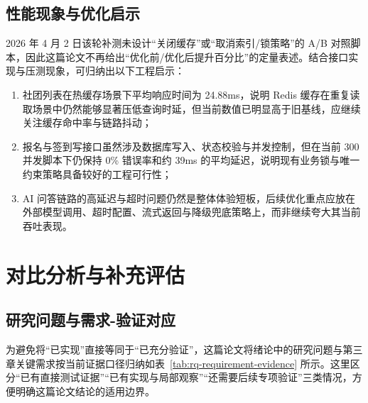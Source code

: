 \subsection{性能现象与优化启示}

2026 年 4 月 2 日该轮补测未设计“关闭缓存”或“取消索引/锁策略”的 A/B 对照脚本，因此这篇论文不再给出“优化前/优化后提升百分比”的定量表述。结合接口实现与压测现象，可归纳出以下工程启示：

\begin{enumerate}
  \item 社团列表在热缓存场景下平均响应时间为 24.88ms，说明 Redis 缓存在重复读取场景中仍然能够显著压低查询时延，但当前数值已明显高于旧基线，应继续关注缓存命中率与链路抖动；
  \item 报名与签到写接口虽然涉及数据库写入、状态校验与并发控制，但在当前 300 并发脚本下仍保持 0\% 错误率和约 39ms 的平均延迟，说明现有业务锁与唯一约束策略具备较好的工程可行性；
  \item AI 问答链路的高延迟与超时问题仍然是整体体验短板，后续优化重点应放在外部模型调用、超时配置、流式返回与降级兜底策略上，而非继续夸大其当前吞吐表现。
\end{enumerate}

\section{对比分析与补充评估}

\subsection{研究问题与需求-验证对应}

为避免将“已实现”直接等同于“已充分验证”，这篇论文将绪论中的研究问题与第三章关键需求按当前证据口径归纳如表~\ref{tab:rq-requirement-evidence} 所示。这里区分“已有直接测试证据”“已有实现与局部观察”“还需要后续专项验证”三类情况，方便明确这篇论文结论的适用边界。

